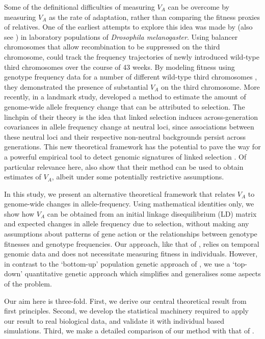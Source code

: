\documentclass[12pt]{article}
\begin{document}
\begin{bibunit}
Some of the definitional difficulties of measuring $V_A$ can be overcome by measuring $V_A$ as the rate of adaptation, rather than comparing the fitness proxies of relatives. One of the earliest attempts to explore this idea was made by \citet{fowler1997genetic} (also see \citet{gardner2005genetic}) in laboratory populations of \emph{Drosophila melanogaster}. Using balancer chromosomes  that allow recombination to be suppressed on the third chromosome, \citet{fowler1997genetic} could track the frequency trajectories of newly introduced wild-type third chromosomes over the course of 43 weeks. By modeling fitness using genotype frequency data for a number of different wild-type third chromosomes  \citep{barton2000measuring}, they demonstrated the presence of substantial $V_A$ on the third chromosome. More recently, in a landmark study, \citet{buffalo2019linked} developed a method to estimate the amount of genome-wide allele frequency change that can be attributed to selection.  The linchpin of their theory is the idea that linked selection induces across-generation covariances in allele frequency change at neutral loci, since associations between these neutral loci and their respective non-neutral backgrounds persist across generations. This new theoretical framework has the potential to pave the way for a powerful empirical tool to detect genomic signatures of linked selection \citep{Buffalo.2020, simon2024contribution}. Of particular relevance here, \citet{buffalo2019linked} also show that their method can be used to obtain estimates of $V_A$, albeit under some potentially restrictive assumptions.

In this study, we present an alternative theoretical framework that relates $V_A$ to genome-wide changes in allele-frequency. Using mathematical identities only, we show how $V_A$ can be obtained from an initial linkage disequilibrium (LD) matrix and expected changes in allele frequency due to selection, without making any assumptions about patterns of gene action or the relationships between genotype fitnesses and genotype frequencies. Our approach, like that of \citet{buffalo2019linked}, relies on temporal genomic data and does not necessitate measuring fitness in individuals. However, in contrast to the `bottom-up' population genetic approach of \citet{buffalo2019linked}, we use a `top-down' quantitative genetic approach which simplifies and generalises some aspects of the problem.

Our aim here is three-fold. First, we derive our central theoretical result from first principles. Second, we develop the statistical machinery required to apply our result to real biological data, and validate it with individual based simulations. Third, we make a detailed comparison of our method with that of \citet{buffalo2019linked}.


\end{bibunit}
\end{document}

